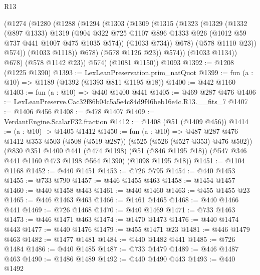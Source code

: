 \begin{lexlean}{R13}
\begin{coremodule}
              (@1274
                (@1280
                  (@1288
                    (@1294
                      (@1303
                        (@1309
                          (@1315
                            (@1323
                              (@1329
                                (@1332
                                  (@897 @1333)
                                  @1319
                                  (@904
                                    @322
                                    @725
                                    @1107
                                    @896
                                    @1333
                                    @926
                                    (@1012 @59 @737 @441 @1007 @475 @1035 @574))
                                  (@1033 @734))
                                @678)
                              (@578 @1110 @23))
                            @574))
                        (@1033 @1118))
                      @678)
                    (@578 @1126 @23))
                  @574))
              (@1033 @1134))
            @678)
          (@578 @1142 @23))
        @574)
      (@1081 @1150))
    @1093
@1392 := @1208 (@1225 @1390)
@1393 := LexLeanPreservation.prim_natQuot
@1399 := fun (a : @10) => @1189 (@1392 (@1393 @811 @1195 @18))
@1400 := @442 @1160
@1403 := fun (a : @10) => @440 @1400 @441
@1405 := @469 @287 @476
@1406 := LexLeanPreserve.Cac32f86b04c5a5e4c84d9f46beb16e4c.R13.__fits_7
@1407 := @1406 @456
@1408 := @478 @1407
@1409 := VerdantEngine.ScalarF32.fraction
@1412 := @1408 (@51 (@1409 @456))
@1414 := (a : @10) -> @1405 @1412
@1450 := fun (a : @10) =>
  @487
    @287
    @476
    @1412
    @353
    @503
    (@508 (@519 @287))
    (@525 (@526 (@527 @353) @476 @502))
    (@830
      @351
      @1400
      @441
      (@474 @1198)
      (@51 (@846 @1195 @18))
      (@547 @346 @441 @1160 @473 @1198 @564 @1390)
      (@1098 @1195 @18))
@1451 := @1104 @1168
@1452 := @440 @1451
@1453 := @726 @795
@1454 := @440 @1453
@1455 := @733 @790
@1457 := @446 @1455 @463
@1458 := @1454 @1457
@1460 := @440 @1458 @443
@1461 := @440 @1460
@1463 := @455 @1455 @23
@1465 := @446 @1463 @463
@1466 := @1461 @1465
@1468 := @440 @1466 @441
@1469 := @726 @1468
@1470 := @440 @1469
@1471 := @733 @1463
@1473 := @446 @1471 @463
@1474 := @1470 @1473
@1476 := @440 @1474 @443
@1477 := @440 @1476
@1479 := @455 @1471 @23
@1481 := @446 @1479 @463
@1482 := @1477 @1481
@1484 := @440 @1482 @441
@1485 := @726 @1484
@1486 := @440 @1485
@1487 := @733 @1479
@1489 := @446 @1487 @463
@1490 := @1486 @1489
@1492 := @440 @1490 @443
@1493 := @440 @1492

\end{coremodule}
\end{lexlean}
